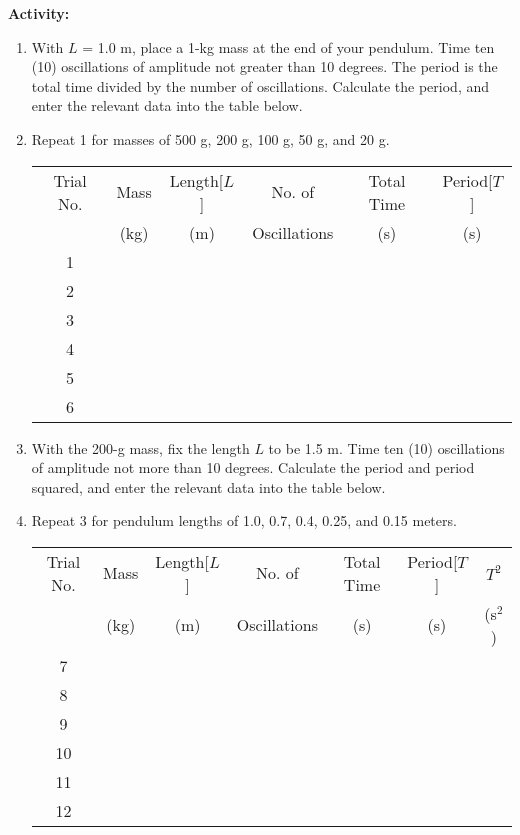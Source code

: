 \medskip
{\noindent \bf Activity:} \begin{enumerate}

\item With $L$ = 1.0 m, place a 1-kg mass at the end of your pendulum. Time ten (10) oscillations of amplitude not greater than 10 degrees. The period is the total time divided by the number of oscillations. Calculate the period, and enter the relevant data into the table below.

\item Repeat 1 for masses of 500 g, 200 g, 100 g, 50 g, and 20 g.

\begin{center} \begin{tabular}{|c|c|c|c|c|c|} \hline Trial No. & Mass & Length[$L$] & No. of & Total Time & Period[$T$] \\ & (kg) & (m) & Oscillations & (s) & (s) \\ \hline \hline 1 & & & & & \\ \hline 2 & & & & & \\ \hline 3 & & & & & \\ \hline 4 & & & & & \\ \hline 5 & & & & & \\ \hline 6 & & & & & \\ \hline \end{tabular} \end{center}

\item With the 200-g mass, fix the length $L$ to be 1.5 m. Time ten (10) oscillations of amplitude not more than 10 degrees. Calculate the period and period squared, and enter the relevant data into the table below.

\item Repeat 3 for pendulum lengths of 1.0, 0.7, 0.4, 0.25, and 0.15 meters.

\begin{center} \begin{tabular}{|c|c|c|c|c|c|c|} \hline Trial No. & Mass & Length[$L$] & No. of & Total Time & Period[$T$] & $T^2$ \\ & (kg) & (m) & Oscillations & (s) & (s) & (s$^2$) \\ \hline \hline 7 & & & & & & \\ \hline 8 & & & & & & \\ \hline 9 & & & & & & \\ \hline 10 & & & & & & \\ \hline 11 & & & & & & \\ \hline 12 & & & & & & \\ \hline \end{tabular} \end{center}


\end{enumerate}
